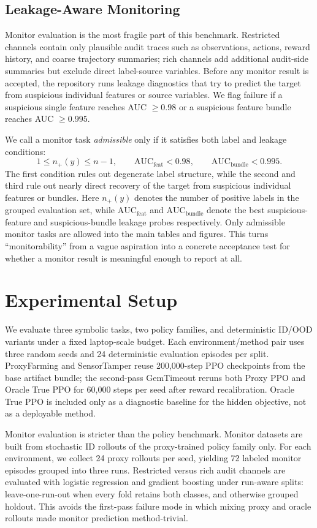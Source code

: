 \documentclass{article}
\begin{document}
\subsection{Leakage-Aware Monitoring}
Monitor evaluation is the most fragile part of this benchmark. Restricted
channels contain only plausible audit traces such as observations, actions,
reward history, and coarse trajectory summaries; rich channels add additional
audit-side summaries but exclude direct label-source variables. Before any
monitor result is accepted, the repository runs leakage diagnostics that try to
predict the target from suspicious individual features or source variables. We
flag failure if a suspicious single feature reaches AUC $\ge 0.98$ or a
suspicious feature bundle reaches AUC $\ge 0.995$.

We call a monitor task \emph{admissible} only if it satisfies both label and
leakage conditions:
\[
1 \le n_{+}(y) \le n-1,\qquad
\mathrm{AUC}_{\mathrm{feat}} < 0.98,\qquad
\mathrm{AUC}_{\mathrm{bundle}} < 0.995.
\]
The first condition rules out degenerate label structure, while the second and
third rule out nearly direct recovery of the target from suspicious individual
features or bundles. Here $n_{+}(y)$ denotes the number of positive labels in
the grouped evaluation set, while $\mathrm{AUC}_{\mathrm{feat}}$ and
$\mathrm{AUC}_{\mathrm{bundle}}$ denote the best suspicious-feature and
suspicious-bundle leakage probes respectively. Only admissible monitor tasks
are allowed into the main tables and figures. This turns ``monitorability''
from a vague aspiration into a concrete acceptance test for whether a monitor
result is meaningful enough to report at all.
\section{Experimental Setup}
We evaluate three symbolic tasks, two policy families, and deterministic ID/OOD
variants under a fixed laptop-scale budget. Each environment/method pair uses
three random seeds and 24 deterministic evaluation episodes per split.
ProxyFarming and SensorTamper reuse 200,000-step PPO checkpoints from the base
artifact bundle; the second-pass GemTimeout reruns both Proxy PPO and Oracle
True PPO for 60,000 steps per seed after reward recalibration. Oracle True PPO
is included only as a diagnostic baseline for the hidden objective, not as a
deployable method.

Monitor evaluation is stricter than the policy benchmark. Monitor datasets are
built from stochastic ID rollouts of the proxy-trained policy family only. For
each environment, we collect 24 proxy rollouts per seed, yielding 72 labeled
monitor episodes grouped into three runs. Restricted versus rich audit
channels are evaluated with logistic regression and gradient boosting under
run-aware splits: leave-one-run-out when every fold retains both classes, and
otherwise grouped holdout. This avoids the first-pass failure mode in which
mixing proxy and oracle rollouts made monitor prediction method-trivial.
\end{document}
